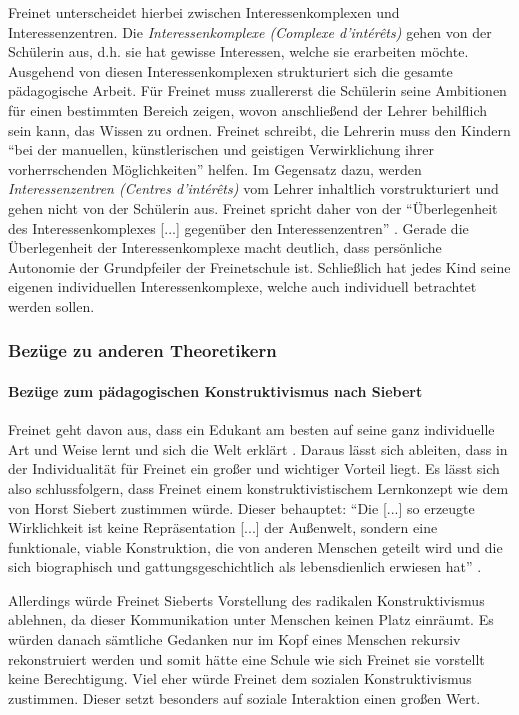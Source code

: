 Freinet unterscheidet hierbei zwischen Interessenkomplexen und Interessenzentren.
Die \emph{Interessenkomplexe (Complexe d'intérêts)} gehen von der Schülerin aus, d.h. sie hat gewisse Interessen, welche sie erarbeiten möchte.
Ausgehend von diesen Interessenkomplexen strukturiert sich die gesamte pädagogische Arbeit.
Für Freinet muss zuallererst die Schülerin seine Ambitionen für einen bestimmten Bereich zeigen, wovon anschließend der Lehrer behilflich sein kann, das Wissen zu ordnen.
Freinet schreibt, die Lehrerin muss den Kindern ``bei der manuellen, künstlerischen und geistigen Verwirklichung ihrer vorherrschenden Möglichkeiten'' \citep[~90]{Freinet1979} helfen.
Im Gegensatz dazu, werden \emph{Interessenzentren (Centres d'intérêts)} vom Lehrer inhaltlich vorstrukturiert und gehen nicht von der Schülerin aus.
Freinet spricht daher von der ``Überlegenheit des Interessenkomplexes [...] gegenüber den Interessenzentren'' \citep[~89]{Freinet1979}.
Gerade die Überlegenheit der Interessenkomplexe macht deutlich, dass persönliche Autonomie der Grundpfeiler der Freinetschule ist.
Schließlich hat jedes Kind seine eigenen individuellen Interessenkomplexe, welche auch individuell betrachtet werden sollen.

\subsubsection{Bezüge zu anderen Theoretikern}

\paragraph{Bezüge zum pädagogischen Konstruktivismus nach Siebert}

Freinet geht davon aus, dass ein Edukant am besten auf seine ganz individuelle Art und Weise lernt und sich die Welt erklärt \citep[vgl.][~496]{Freinet-2000a}.
Daraus lässt sich ableiten, dass in der Individualität für Freinet ein großer und wichtiger Vorteil liegt.
Es lässt sich also schlussfolgern, dass Freinet einem konstruktivistischem Lernkonzept wie dem von Horst Siebert zustimmen würde.
Dieser behauptet: ``Die [...] so erzeugte Wirklichkeit ist keine Repräsentation [...] der Außenwelt, sondern eine funktionale, viable Konstruktion, die von anderen Menschen geteilt wird und die sich biographisch und gattungsgeschichtlich als lebensdienlich erwiesen hat'' \citep[~6]{siebert-2003}.

Allerdings würde Freinet Sieberts Vorstellung des radikalen Konstruktivismus ablehnen, da dieser Kommunikation unter Menschen keinen Platz einräumt.
Es würden danach sämtliche Gedanken nur im Kopf eines Menschen rekursiv rekonstruiert werden \citep[vgl.][~10]{siebert-2003} und somit hätte eine Schule wie sich Freinet sie vorstellt keine Berechtigung.
Viel eher würde Freinet dem sozialen Konstruktivismus zustimmen.
Dieser setzt besonders auf soziale Interaktion einen großen Wert.

